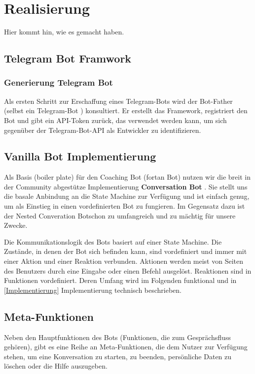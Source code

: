 \label{Realisierung}
\chapter{Realisierung}

Hier kommt hin, wie es gemacht haben.  

    \section{Telegram Bot Framwork}

        \subsection{Generierung Telegram Bot}

            Als ersten Schritt zur Erschaffung eines Telegram-Bots wird der Bot-Father (selbst ein Telegram-Bot \cite{coreTelegram}) konsultiert.  Er erstellt das Framework, registriert den Bot und gibt ein API-Token zurück, das verwendet werden kann, um sich gegenüber der Telegram-Bot-API als Entwickler zu identifizieren. \cite{telegramAPI}


        \section{Vanilla Bot Implementierung}
            Als Basis (boiler plate) für den Coaching Bot (fortan \glqq Bot\grqq) nutzen wir die breit in der Community abgestütze Implementierung \textbf{Conversation Bot} \cite{conversationBot}. Sie stellt uns die basale Anbindung an die State Machine zur Verfügung und ist einfach genug, um als Einstieg in einen vordefinierten Bot zu fungieren. Im Gegensatz dazu ist der \glqq Nested Converation Bot\grqq  schon zu umfangreich und zu mächtig für unsere Zwecke.

            Die Kommunikationslogik des Bots basiert auf einer State Machine. Die Zustände, in denen der Bot sich befinden kann, sind vordefiniert und immer mit einer Aktion und einer Reaktion verbunden. Aktionen werden meist von Seiten des Benutzers durch eine Eingabe oder einen Befehl ausgelöst. Reaktionen sind in Funktionen vordefiniert. Deren Umfang wird im Folgenden funktional und in \ref{Implementierung} Implementierung technisch beschrieben.

    
    \section{Meta-Funktionen}
        Neben den Hauptfunktionen des Bots (Funktionen, die zum Gesprächsfluss gehören), gibt es eine Reihe an Meta-Funktionen, die dem Nutzer zur Verfügung stehen, um eine Konversation zu starten, zu beenden, persönliche Daten zu löschen oder die Hilfe auszugeben.

